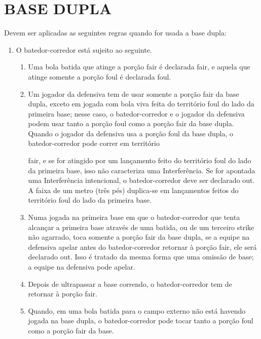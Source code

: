 \section{BASE DUPLA}
Devem ser aplicadas as seguintes regras quando for usada a base dupla:
\begin{enumerate}[label=(\alph*)]
	\item O batedor-corredor está sujeito ao seguinte.

	\begin{enumerate}[label=\roman*.]
		\item Uma bola batida que atinge a porção \gls{fair} é declarada \gls{fair}, e aquela que atinge somente a porção \gls{foul} é declarada \gls{foul}.

		\item Um jogador da defensiva tem de usar somente a porção \gls{fair} da base dupla, exceto em jogada com bola viva feita do território \gls{foul} do lado da primeira base;
		nesse caso, o batedor-corredor e o jogador da defensiva podem usar tanto a  porção \gls{foul} como a porção \gls{fair} da base dupla. Quando o jogador da defensiva  usa a porção \gls{foul} da base dupla, o batedor-corredor pode correr em território

		\gls{fair}, e se for atingido por um lançamento feito do território \gls{foul} do lado da primeira base, isso não caracteriza uma Interferência. Se for apontada uma Interferência intencional, o batedor-corredor deve ser declarado \gls{out}. A faixa  de um metro (três pés) duplica-se em lançamentos feitos do território \gls{foul} do lado da primeira base.

		\item Numa jogada na primeira base em que o batedor-corredor que tenta alcançar a primeira base através de uma batida, ou de um terceiro \gls{strike} não agarrado, toca somente a porção \gls{fair} da base dupla, se a equipe na defensiva apelar antes do batedor-corredor retornar à porção \gls{fair}, ele será declarado \gls{out}. Isso é tratado da mesma forma que uma omissão de base; a equipe na defensiva  pode apelar.

		\item  Depois de ultrapassar a base correndo, o batedor-corredor tem de retornar à porção \gls{fair}.

		\item Quando, em uma bola batida para o campo externo não está havendo jogada na base dupla, o batedor-corredor pode tocar tanto a porção \gls{foul} como a porção \gls{fair} da base.
	\end{enumerate}


\end{enumerate}
